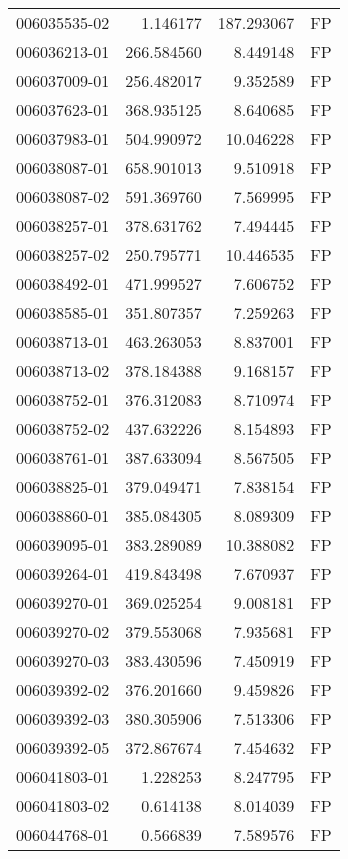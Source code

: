 \begin{tabular}{lrrl}
006035535-02 &    1.146177 &   187.293067 &   FP \\
006036213-01 &  266.584560 &     8.449148 &   FP \\
006037009-01 &  256.482017 &     9.352589 &   FP \\
006037623-01 &  368.935125 &     8.640685 &   FP \\
006037983-01 &  504.990972 &    10.046228 &   FP \\
006038087-01 &  658.901013 &     9.510918 &   FP \\
006038087-02 &  591.369760 &     7.569995 &   FP \\
006038257-01 &  378.631762 &     7.494445 &   FP \\
006038257-02 &  250.795771 &    10.446535 &   FP \\
006038492-01 &  471.999527 &     7.606752 &   FP \\
006038585-01 &  351.807357 &     7.259263 &   FP \\
006038713-01 &  463.263053 &     8.837001 &   FP \\
006038713-02 &  378.184388 &     9.168157 &   FP \\
006038752-01 &  376.312083 &     8.710974 &   FP \\
006038752-02 &  437.632226 &     8.154893 &   FP \\
006038761-01 &  387.633094 &     8.567505 &   FP \\
006038825-01 &  379.049471 &     7.838154 &   FP \\
006038860-01 &  385.084305 &     8.089309 &   FP \\
006039095-01 &  383.289089 &    10.388082 &   FP \\
006039264-01 &  419.843498 &     7.670937 &   FP \\
006039270-01 &  369.025254 &     9.008181 &   FP \\
006039270-02 &  379.553068 &     7.935681 &   FP \\
006039270-03 &  383.430596 &     7.450919 &   FP \\
006039392-02 &  376.201660 &     9.459826 &   FP \\
006039392-03 &  380.305906 &     7.513306 &   FP \\
006039392-05 &  372.867674 &     7.454632 &   FP \\
006041803-01 &    1.228253 &     8.247795 &   FP \\
006041803-02 &    0.614138 &     8.014039 &   FP \\
006044768-01 &    0.566839 &     7.589576 &   FP \\

\end{tabular}
